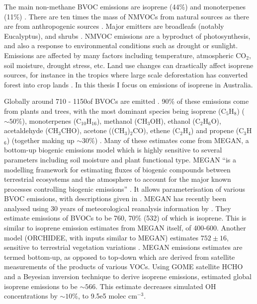     The main non-methane BVOC emissions are isoprene (44\%) and monoterpenes (11\%) \parencite{Guenther2000, Kefauver2014}. 
    There are ten times the mass of NMVOCs from natural sources as there are from anthropogenic sources \parencite{Guenther2006, Kanakidou2005, Millet2006}.
    Major emitters are broadleafs (notably Eucalyptus), and shrubs \parencite{Guenther2006, Arneth2008, Niinemets2010, Monks2015}.
    NMVOC emissions are a byproduct of photosynthesis, and also a response to environmental conditions such as drought or sunlight.
    Emissions are affected by many factors including temperature, atmospheric CO$_2$, soil moisture, drought stress, etc.
    Land use changes can drastically affect isoprene sources, for instance in the tropics where large scale deforestation has converted forest into crop lands \parencite{Kanakidou2005}.
    In this thesis I focus on emissions of isoprene in Australia.
    
    Globally around 710 - 1150\tgcpyr of BVOCs are emitted \parencite{Guenther1995,Lathiere2006,Guenther2012, Lathiere2016}.
    90\% of these emissions come from plants and trees, with the most dominant species being isoprene (C$_5$H$_8$) ($\sim50\%$), monoterpenes (C$_10$H$_16$), methanol (CH$_3$OH), ethanol (C$_2$H$_6$O), acetaldehyde (CH$_3$CHO), acetone ((CH$_3$)$_2$CO), ethene (C$_2$H$_4$) and propene (C$_3$H$_6$) (together making up $\sim30\%$) \parencite{Guenther2012}.
    Many of these estimates come from MEGAN, a bottom-up biogenic emissions model which is highly sensitive to several parameters including soil moisture and plant functional type.
    MEGAN ``is a modelling framework for estimating fluxes of biogenic compounds between terrestrial ecosystems and the atmosphere to account for the major known processes controlling biogenic emissions'' \parencite{Guenther2012}.
    It allows parameterisation of various BVOC emissions, with descriptions given in \textcite{Guenther2012}.
    MEGAN has recently been analysed using 30 years of meteorological reanalysis information by \textcite{Sindelarova2014}.
    They estimate emissions of BVOCs to be 760\tgcpyr, 70\% (532\tgcpyr) of which is isoprene.
    This is similar to isoprene emission estimates from MEGAN itself, of 400-600\tgcpyr \parencite{Guenther2006}.
    Another model (ORCHIDEE, with inputs similar to MEGAN) estimates $752\pm16$\tgcpyr, sensitive to terrestrial vegetation variations \parencite{Lathiere2006}.
    MEGAN emissions estimates are termed bottom-up, as opposed to top-down which are derived from satellite measurements of the products of various VOCs.
    Using GOME satellite HCHO and a Beyesian inversion technique to derive isoprene emissions, \textcite{Shim2005} estimated global isoprene emissions to be $\sim566$\tgcpyr. 
    This estimate decreases simulated OH concentrations by $\sim10\%$, to 9.5e5 molec cm$^{-3}$.
    
